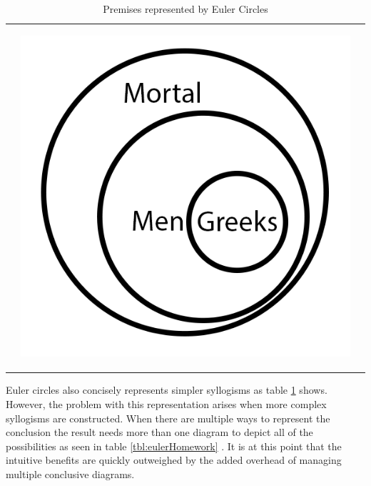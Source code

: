 \documentclass[12pt,a4paper]{report}
\begin{document}
\begin{table}[htb]
\begin{tabular}{ c  c  c }
\begin{minipage}{.29\textwidth}
\begin{center}
         \end{center}
    \end{minipage}
    & 
    \begin{minipage}{.29\textwidth}
         \begin{center}
         \includegraphics[scale=0.25]{EulerAllGreeksAreMortal}
    \end{center}
    \end{minipage}
    \\
  \end{tabular}
  \caption{Premises represented by Euler Circles}\label{tbl:eulerAllMenMortal}
\end{table}
\FloatBarrier
Euler circles also concisely represents simpler syllogisms as table \ref{tbl:eulerAllMenMortal} shows. However, the problem with this representation arises when more complex syllogisms are constructed. When there are multiple ways to represent the conclusion the result needs more than one diagram to depict all of the possibilities as seen in table \ref{tbl:eulerHomework} . It is at this point that the intuitive benefits are quickly outweighed by the added overhead of managing multiple conclusive diagrams.
\end{document}
